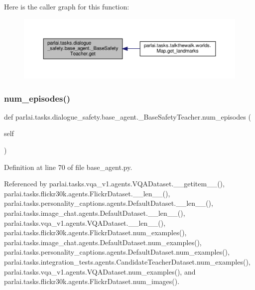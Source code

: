 Here is the caller graph for this function\+:
\nopagebreak
\begin{figure}[H]
\begin{center}
\leavevmode
\includegraphics[width=350pt]{classparlai_1_1tasks_1_1dialogue__safety_1_1base__agent_1_1__BaseSafetyTeacher_afde2a1fdb6fa5aa3da3544624f8068b6_icgraph}
\end{center}
\end{figure}
\mbox{\label{classparlai_1_1tasks_1_1dialogue__safety_1_1base__agent_1_1__BaseSafetyTeacher_ab42e92e403d07dcd0f211a2c2732c2d9}} 
\subsubsection{\texorpdfstring{num\+\_\+episodes()}{num\_episodes()}}
{\footnotesize\ttfamily def parlai.\+tasks.\+dialogue\+\_\+safety.\+base\+\_\+agent.\+\_\+\+Base\+Safety\+Teacher.\+num\+\_\+episodes (\begin{DoxyParamCaption}\item[{}]{self }\end{DoxyParamCaption})}



Definition at line 70 of file base\+\_\+agent.\+py.



Referenced by parlai.\+tasks.\+vqa\+\_\+v1.\+agents.\+V\+Q\+A\+Dataset.\+\_\+\+\_\+getitem\+\_\+\+\_\+(), parlai.\+tasks.\+flickr30k.\+agents.\+Flickr\+Dataset.\+\_\+\+\_\+len\+\_\+\+\_\+(), parlai.\+tasks.\+personality\+\_\+captions.\+agents.\+Default\+Dataset.\+\_\+\+\_\+len\+\_\+\+\_\+(), parlai.\+tasks.\+image\+\_\+chat.\+agents.\+Default\+Dataset.\+\_\+\+\_\+len\+\_\+\+\_\+(), parlai.\+tasks.\+vqa\+\_\+v1.\+agents.\+V\+Q\+A\+Dataset.\+\_\+\+\_\+len\+\_\+\+\_\+(), parlai.\+tasks.\+flickr30k.\+agents.\+Flickr\+Dataset.\+num\+\_\+examples(), parlai.\+tasks.\+image\+\_\+chat.\+agents.\+Default\+Dataset.\+num\+\_\+examples(), parlai.\+tasks.\+personality\+\_\+captions.\+agents.\+Default\+Dataset.\+num\+\_\+examples(), parlai.\+tasks.\+integration\+\_\+tests.\+agents.\+Candidate\+Teacher\+Dataset.\+num\+\_\+examples(), parlai.\+tasks.\+vqa\+\_\+v1.\+agents.\+V\+Q\+A\+Dataset.\+num\+\_\+examples(), and parlai.\+tasks.\+flickr30k.\+agents.\+Flickr\+Dataset.\+num\+\_\+images().

